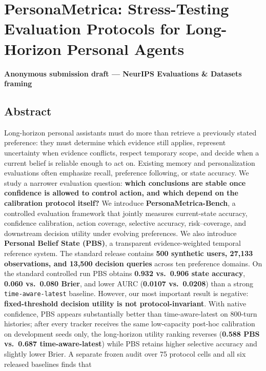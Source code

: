 \documentclass[
  10pt,
  letterpaper,
]{article}
\author{}
\date{}
\begin{document}
\section{PersonaMetrica: Stress-Testing Evaluation Protocols for
Long-Horizon Personal
Agents}\label{personametrica-stress-testing-evaluation-protocols-for-long-horizon-personal-agents}

\textbf{Anonymous submission draft --- NeurIPS Evaluations \& Datasets
framing}

\subsection{Abstract}\label{abstract}

Long-horizon personal assistants must do more than retrieve a previously
stated preference: they must determine which evidence still applies,
represent uncertainty when evidence conflicts, respect temporary scope,
and decide when a current belief is reliable enough to act on. Existing
memory and personalization evaluations often emphasize recall,
preference following, or state accuracy. We study a narrower evaluation
question: \textbf{which conclusions are stable once confidence is
allowed to control action, and which depend on the calibration protocol
itself?} We introduce \textbf{PersonaMetrica-Bench}, a controlled
evaluation framework that jointly measures current-state accuracy,
confidence calibration, action coverage, selective accuracy,
risk--coverage, and downstream decision utility under evolving
preferences. We also introduce \textbf{Personal Belief State (PBS)}, a
transparent evidence-weighted temporal reference system. The standard
release contains \textbf{500 synthetic users, 27,133 observations, and
13,500 decision queries} across ten preference domains. On the standard
controlled run PBS obtains \textbf{0.932 vs.~0.906 state accuracy},
\textbf{0.060 vs.~0.080 Brier}, and lower AURC (\textbf{0.0107
vs.~0.0208}) than a strong \texttt{time-aware-latest} baseline. However,
our most important result is negative: \textbf{fixed-threshold decision
utility is not protocol-invariant}. With native confidence, PBS appears
substantially better than time-aware-latest on 800-turn histories; after
every tracker receives the same low-capacity post-hoc calibration on
development seeds only, the long-horizon utility ranking reverses
(\textbf{0.588 PBS vs.~0.687 time-aware-latest}) while PBS retains
higher selective accuracy and slightly lower Brier. A separate frozen
audit over 75 protocol cells and all six released baselines finds that
\end{document}
